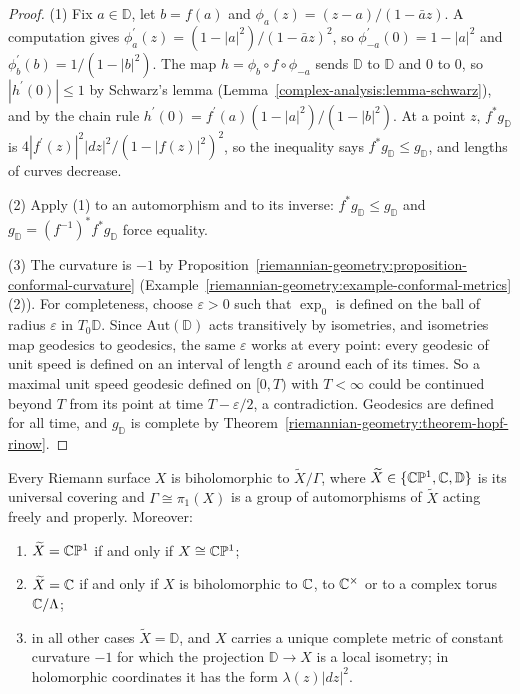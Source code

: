 \begin{proof}
(1) Fix $a \in \mathbb{D}$, let $b = f(a)$ and $\phi_a(z) = (z - a)/(1 - \bar az)$. A computation gives $\phi_a^{\prime}(z) = (1 - |a|^2)/(1 - \bar az)^2$, so
$\phi_{-a}^{\prime}(0) = 1 - |a|^2$ and $\phi_b^{\prime}(b) = 1/(1 - |b|^2)$. The map $h = \phi_b \circ f \circ \phi_{-a}$ sends $\mathbb{D}$ to $\mathbb{D}$ and $0$ to $0$, so
$|h^{\prime}(0)| \leq 1$ by Schwarz's lemma (Lemma~\ref{complex-analysis:lemma-schwarz}), and by the chain rule $h^{\prime}(0) = f^{\prime}(a)(1 - |a|^2)/(1 - |b|^2)$. At a point
$z$, $f^*g_{\mathbb{D}}$ is $4|f^{\prime}(z)|^2|dz|^2/(1 - |f(z)|^2)^2$, so the inequality says $f^*g_{\mathbb{D}} \leq g_{\mathbb{D}}$, and lengths of curves decrease.

(2) Apply (1) to an automorphism and to its inverse: $f^*g_{\mathbb{D}} \leq g_{\mathbb{D}}$ and $g_{\mathbb{D}} = (f^{-1})^*f^*g_{\mathbb{D}}$ force equality.

(3) The curvature is $-1$ by Proposition~\ref{riemannian-geometry:proposition-conformal-curvature} (Example~\ref{riemannian-geometry:example-conformal-metrics}(2)). For
completeness, choose $\varepsilon > 0$ such that $\exp_0$ is defined on the ball of radius $\varepsilon$ in $T_0\mathbb{D}$. Since $\mathrm{Aut}(\mathbb{D})$ acts transitively
by isometries, and isometries map geodesics to geodesics, the same $\varepsilon$ works at every point: every geodesic of unit speed is defined on an interval of length
$\varepsilon$ around each of its times. So a maximal unit speed geodesic defined on $[0, T)$ with $T < \infty$ could be continued beyond $T$ from its point at time
$T - \varepsilon/2$, a contradiction. Geodesics are defined for all time, and $g_{\mathbb{D}}$ is complete by Theorem~\ref{riemannian-geometry:theorem-hopf-rinow}.
\end{proof}

\begin{theorem}\label{complex-manifolds:theorem-riemann-surfaces-classification}
Every Riemann surface $X$ is biholomorphic to $\widetilde{X}/\Gamma$, where $\widetilde{X} \in \{\mathbb{C}\mathbb{P}^1, \mathbb{C}, \mathbb{D}\}$ is its universal covering and $\Gamma \cong \pi_1(X)$ is
a group of automorphisms of $\widetilde{X}$ acting freely and properly. Moreover:
\begin{enumerate}
\item $\widetilde{X} = \mathbb{C}\mathbb{P}^1$ if and only if $X \cong \mathbb{C}\mathbb{P}^1$;
\item $\widetilde{X} = \mathbb{C}$ if and only if $X$ is biholomorphic to $\mathbb{C}$, to $\mathbb{C}^\times$ or to a complex torus $\mathbb{C}/\Lambda$;
\item in all other cases $\widetilde{X} = \mathbb{D}$, and $X$ carries a unique complete metric of constant curvature $-1$ for which the projection $\mathbb{D} \to X$ is a local
isometry; in holomorphic coordinates it has the form $\lambda(z)|dz|^2$.
\end{enumerate}
\end{theorem}

